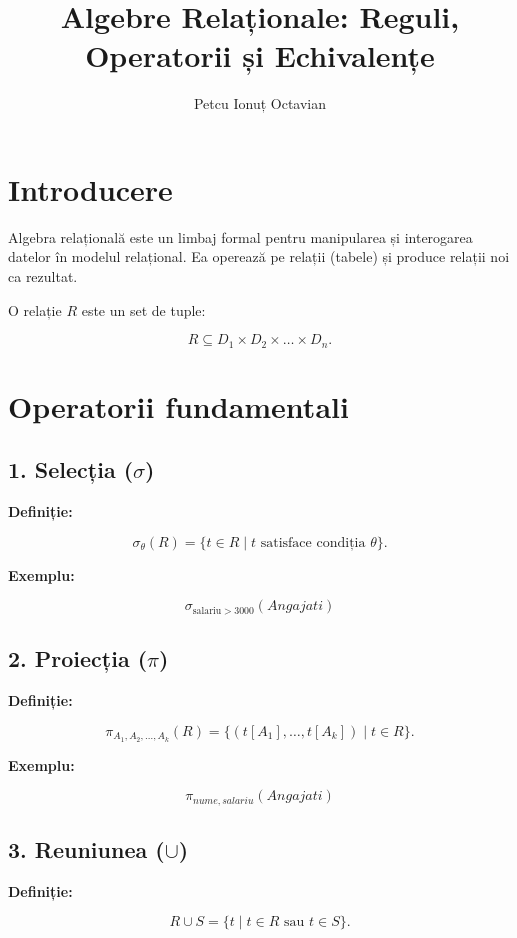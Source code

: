 \documentclass[12pt,a4paper]{article}
\title{Algebre Relaționale: Reguli, Operatorii și Echivalențe}
\author{Petcu Ionuț Octavian}
\date{}
\begin{document}
\maketitle

\section{Introducere}
Algebra relațională este un limbaj formal pentru manipularea și interogarea datelor în modelul relațional. Ea operează pe relații (tabele) și produce relații noi ca rezultat.

O relație $R$ este un set de tuple:


\[
R \subseteq D_1 \times D_2 \times \dots \times D_n.
\]



\section{Operatorii fundamentali}

\subsection{1. Selecția ($\sigma$)}
\textbf{Definiție:}


\[
\sigma_{\theta}(R) = \{ t \in R \mid t \text{ satisface condiția } \theta \}.
\]



\textbf{Exemplu:}


\[
\sigma_{\text{salariu} > 3000}(Angajati)
\]



\subsection{2. Proiecția ($\pi$)}
\textbf{Definiție:}


\[
\pi_{A_1, A_2, \dots, A_k}(R) = \{ (t[A_1], \dots, t[A_k]) \mid t \in R \}.
\]



\textbf{Exemplu:}


\[
\pi_{nume, salariu}(Angajati)
\]



\subsection{3. Reuniunea ($\cup$)}
\textbf{Definiție:}


\[
R \cup S = \{ t \mid t \in R \text{ sau } t \in S \}.
\]
\end{document}
